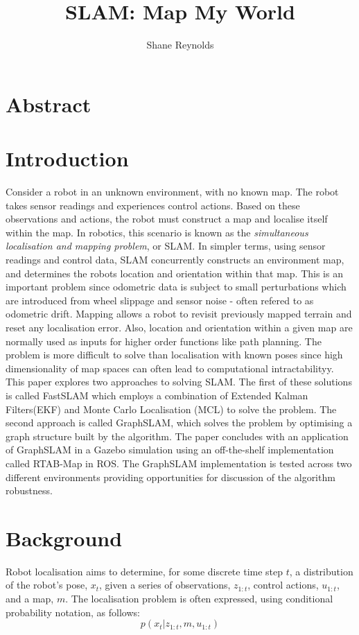 \documentclass[a4paper]{article}
\begin{document}
\title{SLAM: Map My World}
\author{Shane Reynolds}
\maketitle

\section*{Abstract}

\section{Introduction}
Consider a robot in an unknown environment, with no known map. The robot takes sensor readings and experiences control actions. Based on these observations and actions, the robot must construct a map and localise itself within the map. In robotics, this scenario is known as the \textit{simultaneous localisation and mapping problem}, or SLAM. In simpler terms, using sensor readings and control data, SLAM concurrently constructs an environment map, and determines the robots location and orientation within that map. This is an important problem since odometric data is subject to small perturbations which are introduced from wheel slippage and sensor noise - often refered to as odometric drift. Mapping allows a robot to revisit previously mapped terrain and reset any localisation error. Also, location and orientation within a given map are normally used as inputs for higher order functions like path planning. The problem is more difficult to solve than localisation with known poses since high dimensionality of map spaces can often lead to computational intractabilityy. This paper explores two approaches to solving SLAM. The first of these solutions is called FastSLAM which employs a combination of Extended Kalman Filters(EKF) and Monte Carlo Localisation (MCL) to solve the problem. The second approach is called GraphSLAM, which solves the problem by optimising a graph structure built by the algorithm. The paper concludes with an application of GraphSLAM in a Gazebo simulation using an off-the-shelf implementation called RTAB-Map in ROS. The GraphSLAM implementation is tested across two different environments providing opportunities for discussion of the algorithm robustness.

\section{Background}
Robot localisation aims to determine, for some discrete time step $t$, a distribution of the robot's pose, $x_t$, given a series of observations, $z_{1:t}$, control actions, $u_{1:t}$, and a map, $m$. The localisation problem is often expressed, using conditional probability notation, as follows:
\begin{equation}
p(x_t | z_{1:t}, m, u_{1:t})
\end{equation}
\end{document}
